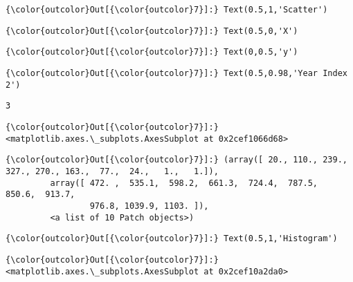 \documentclass[11pt]{article}
\begin{document}
\begin{Verbatim}[commandchars=\\\{\}]
{\color{outcolor}Out[{\color{outcolor}7}]:} Text(0.5,1,'Scatter')
\end{Verbatim}
            
\begin{Verbatim}[commandchars=\\\{\}]
{\color{outcolor}Out[{\color{outcolor}7}]:} Text(0.5,0,'X')
\end{Verbatim}
            
\begin{Verbatim}[commandchars=\\\{\}]
{\color{outcolor}Out[{\color{outcolor}7}]:} Text(0,0.5,'y')
\end{Verbatim}
            
\begin{Verbatim}[commandchars=\\\{\}]
{\color{outcolor}Out[{\color{outcolor}7}]:} Text(0.5,0.98,'Year Index 2')
\end{Verbatim}
            
    \begin{Verbatim}[commandchars=\\\{\}]
3

    \end{Verbatim}

\begin{Verbatim}[commandchars=\\\{\}]
{\color{outcolor}Out[{\color{outcolor}7}]:} <matplotlib.axes.\_subplots.AxesSubplot at 0x2cef1066d68>
\end{Verbatim}
            
\begin{Verbatim}[commandchars=\\\{\}]
{\color{outcolor}Out[{\color{outcolor}7}]:} (array([ 20., 110., 239., 327., 270., 163.,  77.,  24.,   1.,   1.]),
         array([ 472. ,  535.1,  598.2,  661.3,  724.4,  787.5,  850.6,  913.7,
                 976.8, 1039.9, 1103. ]),
         <a list of 10 Patch objects>)
\end{Verbatim}
            
\begin{Verbatim}[commandchars=\\\{\}]
{\color{outcolor}Out[{\color{outcolor}7}]:} Text(0.5,1,'Histogram')
\end{Verbatim}
            
\begin{Verbatim}[commandchars=\\\{\}]
{\color{outcolor}Out[{\color{outcolor}7}]:} <matplotlib.axes.\_subplots.AxesSubplot at 0x2cef10a2da0>
\end{Verbatim}
            
\end{document}
